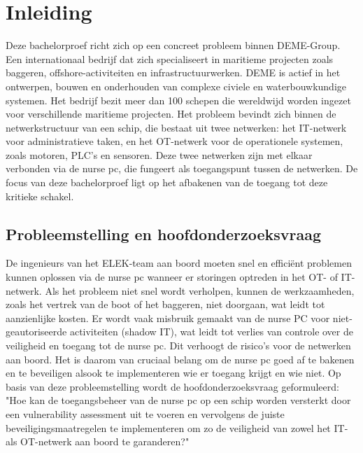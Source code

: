 


% 

\section{Inleiding}%
\label{sec:inleiding}
Deze bachelorproef richt zich op een concreet probleem binnen DEME-Group. Een internationaal bedrijf dat zich specialiseert in maritieme projecten zoals baggeren, offshore-activiteiten en infrastructuurwerken. 
DEME is actief in het ontwerpen, bouwen en onderhouden van complexe civiele en waterbouwkundige systemen. Het bedrijf bezit meer dan 100 schepen die wereldwijd worden ingezet voor verschillende maritieme projecten.
Het probleem bevindt zich binnen de netwerkstructuur van een schip, die bestaat uit twee netwerken: 
het IT-netwerk voor administratieve taken, en het OT-netwerk voor de operationele systemen, zoals motoren, PLC's en sensoren. Deze twee netwerken zijn met elkaar verbonden via de nurse pc, die fungeert 
als toegangspunt tussen de netwerken. De focus van deze bachelorproef ligt op het afbakenen van de toegang tot deze kritieke schakel.

\subsection{Probleemstelling en hoofdonderzoeksvraag}
De ingenieurs van het ELEK-team aan boord moeten snel en efficiënt problemen kunnen oplossen via de nurse pc wanneer er storingen optreden in het OT- of IT-netwerk.
Als het probleem niet snel wordt verholpen, kunnen de werkzaamheden, zoals het vertrek van de boot of het baggeren, niet doorgaan, wat leidt tot aanzienlijke kosten. 
Er wordt vaak misbruik gemaakt van de nurse PC voor niet-geautoriseerde activiteiten (shadow IT), wat leidt tot verlies van controle over de veiligheid en toegang tot de nurse pc. 
Dit verhoogt de risico’s voor de netwerken aan boord. Het is daarom van cruciaal belang om de nurse pc goed af te bakenen en te beveiligen alsook te implementeren wie er toegang krijgt en wie niet.
Op basis van deze probleemstelling wordt de hoofdonderzoeksvraag geformuleerd:
"Hoe kan de toegangsbeheer van de nurse pc op een schip worden versterkt door een vulnerability assessment 
uit te voeren en vervolgens de juiste beveiligingsmaatregelen te implementeren om zo de veiligheid van zowel het IT- als OT-netwerk aan boord te garanderen?"

